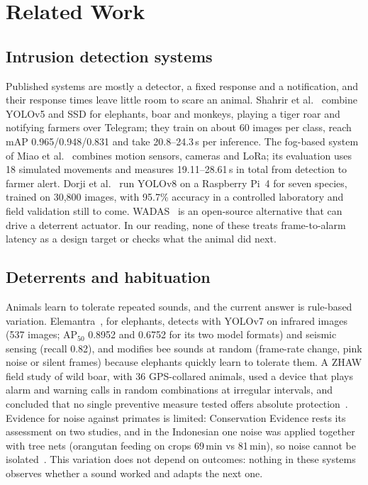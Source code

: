 \documentclass[conference]{IEEEtran}
\begin{document}
\section{Related Work}\label{sec:related}
\subsection{Intrusion detection systems}
Published systems are mostly a detector, a fixed response and a notification, and their response
times leave little room to scare an animal. Shahrir et al.~\cite{shahrir2025hybrid} combine YOLOv5 and SSD
for elephants, boar and monkeys, playing a tiger roar and notifying farmers over Telegram; they train on about
60 images per class, reach mAP 0.965/0.948/0.831 and take 20.8--24.3\,s per inference. The fog-based
system of Miao et al.~\cite{miao2023fog} combines motion sensors, cameras and LoRa; its evaluation uses 18
simulated movements and measures 19.11--28.61\,s in total from detection to farmer alert. Dorji et
al.~\cite{dorji2025bhutan} run YOLOv8 on a Raspberry Pi~4 for seven species, trained on 30,800 images, with
95.7\% accuracy in a controlled laboratory and field validation still to come. WADAS~\cite{repo_wadas}
is an open-source alternative that can drive a deterrent actuator. In our reading, none of these
treats frame-to-alarm latency as a design target or checks what the animal did next.

\subsection{Deterrents and habituation}
Animals learn to tolerate repeated sounds, and the current answer is rule-based variation. Elemantra~\cite{bandara2023elemantra},
for elephants, detects with YOLOv7 on infrared images (537 images; AP$_{50}$ 0.8952 and 0.6752 for its two
model formats) and seismic sensing (recall 0.82), and modifies bee sounds at random (frame-rate change,
pink noise or silent frames) because elephants quickly learn to tolerate them. A ZHAW field study of
wild boar, with 36 GPS-collared animals, used a device that plays alarm and warning calls in random combinations at
irregular intervals, and concluded that no single preventive measure tested offers absolute
protection~\cite{zhaw2019boar}. Evidence for noise against primates is limited: Conservation
Evidence rests its assessment on two studies, and in the Indonesian one noise was applied together with
tree nets (orangutan feeding on crops 69\,min vs 81\,min), so noise cannot be isolated~\cite{ce2026primates}.
This variation does not depend on outcomes: nothing in these systems observes whether a sound worked and
adapts the next one.
\end{document}
